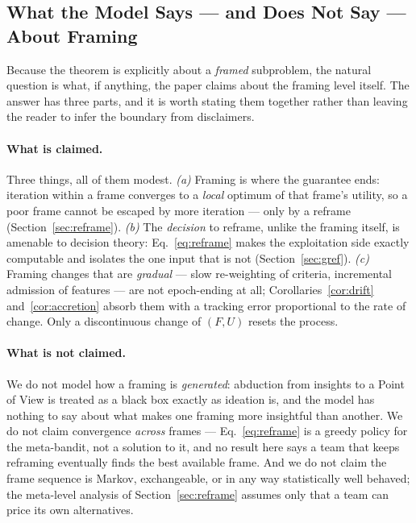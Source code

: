 \documentclass[11pt]{article}
\begin{document}
\subsection{What the Model Says --- and Does Not Say --- About Framing}
\label{sec:framing}

Because the theorem is explicitly about a \emph{framed} subproblem, the natural question is what, if anything, the paper claims about the framing level itself. The answer has three parts, and it is worth stating them together rather than leaving the reader to infer the boundary from disclaimers.

\paragraph{What is claimed.} Three things, all of them modest. \emph{(a)} Framing is where the guarantee ends: iteration within a frame converges to a \emph{local} optimum of that frame's utility, so a poor frame cannot be escaped by more iteration --- only by a reframe (Section~\ref{sec:reframe}). \emph{(b)} The \emph{decision} to reframe, unlike the framing itself, is amenable to decision theory: Eq.~\eqref{eq:reframe} makes the exploitation side exactly computable and isolates the one input that is not (Section~\ref{sec:gref}). \emph{(c)} Framing changes that are \emph{gradual} --- slow re-weighting of criteria, incremental admission of features --- are not epoch-ending at all; Corollaries~\ref{cor:drift} and~\ref{cor:accretion} absorb them with a tracking error proportional to the rate of change. Only a discontinuous change of $(F,U)$ resets the process.

\paragraph{What is not claimed.} We do not model how a framing is \emph{generated}: abduction from insights to a Point of View is treated as a black box exactly as ideation is, and the model has nothing to say about what makes one framing more insightful than another. We do not claim convergence \emph{across} frames --- Eq.~\eqref{eq:reframe} is a greedy policy for the meta-bandit, not a solution to it, and no result here says a team that keeps reframing eventually finds the best available frame. And we do not claim the frame sequence is Markov, exchangeable, or in any way statistically well behaved; the meta-level analysis of Section~\ref{sec:reframe} assumes only that a team can price its own alternatives.
\end{document}
